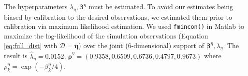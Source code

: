 \documentclass[12pt]{article}
\begin{document}
The hyperparameters $\lambda_\eta,\boldsymbol \beta^\eta$ must be estimated.
% 
To avoid our estimates being biased by calibration to the desired observations, we estimated them prior to calibration via maximum likelihood estimation.
% 
%
We used \texttt{fmincon()} in {\sc Matlab} %
to maximize the log-likelihood of the simulation observations  (Equation \eqref{eq:full_dist} with $\mathcal D=\boldsymbol\eta$) over the joint (6-dimensional) support of $\boldsymbol \beta^\eta,\lambda_\eta$.  
%
The result is $\hat\lambda_\eta = 0.0152$, $\boldsymbol {\hat\rho}^\eta = (0.9358, 0.6509, 0.6736, 0.4797, 0.9673)$
where $\rho^\eta_k = \exp(-\beta_k^\eta/4)$. 

%
%
%

%
%
\end{document}
